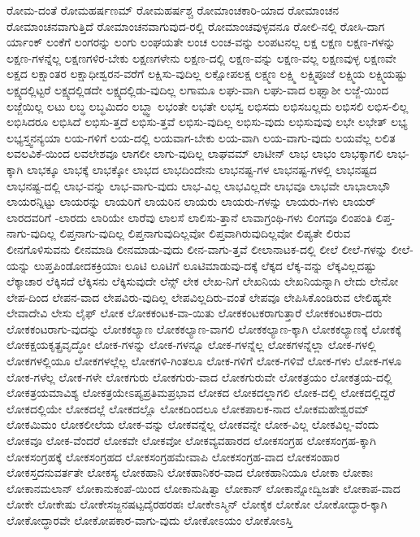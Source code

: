 {ರೋಮ-ದಂತೆ
ರೋಮಹರ್ಷಣಮ್
ರೋಮಹರ್ಷಶ್ಚ
ರೋಮಾಂಚಕಾರಿ-ಯಾದ
ರೋಮಾಂಚನ
ರೋಮಾಂಚನವಾಗುತ್ತಿದೆ
ರೋಮಾಂಚನವಾಗುವುದ-ರಲ್ಲಿ
ರೋಮಾಂಚವುಳ್ಳವನೂ
ರೋಲಿ-ನಲ್ಲಿ
ರೋಸಿ-ದಾಗ
ರ್ಯಾಂಕ್
ಲಂಕೆಗೆ
ಲಂಗರನ್ನು
ಲಂಗು
ಲಂಘಯತೇ
ಲಂಚ
ಲಂಚ-ವನ್ನು
ಲಂಪಟನಲ್ಲ
ಲಕ್ಷ
ಲಕ್ಷಣ
ಲಕ್ಷಣ-ಗಳನ್ನು
ಲಕ್ಷಣ-ಗಳನ್ನೆಲ್ಲ
ಲಕ್ಷಣಗಳಿರ-ಬೇಕು
ಲಕ್ಷಣಗಳೇನು
ಲಕ್ಷಣ-ದಲ್ಲಿ
ಲಕ್ಷಣ-ವನ್ನು
ಲಕ್ಷಣ-ವಲ್ಲ
ಲಕ್ಷಣವುಳ್ಳ
ಲಕ್ಷಣವೇ
ಲಕ್ಷದ
ಲಕ್ಷಾಂತರ
ಲಕ್ಷಾಧೀಶ್ವರನ-ವರೆಗೆ
ಲಕ್ಷಿಸು-ವುದಿಲ್ಲ
ಲಕ್ಷೋಪಲಕ್ಷ
ಲಕ್ಷ್ಮಣ
ಲಕ್ಷ್ಮಿ
ಲಕ್ಷ್ಮಿಪೂಜೆ
ಲಕ್ಷ್ಮಿಯ
ಲಕ್ಷ್ಮಿಯಷ್ಟು
ಲಕ್ಷ್ಯದಲ್ಲಿಟ್ಟರೆ
ಲಕ್ಷ್ಯದಲ್ಲಿಡದೇ
ಲಕ್ಷ್ಯದಲ್ಲಿಡು-ವುದಿಲ್ಲ
ಲಗಾಮೂ
ಲಘು-ವಾಗಿ
ಲಘು-ವಾದ
ಲಘ್ವಾಶೀ
ಲಜ್ಜೆ-ಯಿಂದ
ಲಜ್ಜೆಯಿಲ್ಲ
ಲಟು
ಲಬ್ಧ
ಲಬ್ಧಮಿದಂ
ಲಬ್ಧ್ವಾ
ಲಭಂತೇ
ಲಭತೇ
ಲಭಸ್ವ
ಲಭಿಸದು
ಲಭಿಸಬಲ್ಲದು
ಲಭಿಸಲಿ
ಲಭಿಸ-ಲಿಲ್ಲ
ಲಭಿಸಿದರೂ
ಲಭಿಸಿದೆ
ಲಭಿಸು-ತ್ತದೆ
ಲಭಿಸು-ತ್ತವೆ
ಲಭಿಸು-ವುದಿಲ್ಲ
ಲಭಿಸು-ವುದು
ಲಭಿಸುವುವು
ಲಭೇ
ಲಭೇತ್
ಲಭ್ಯ
ಲಭ್ಯಸ್ತ್ವನನ್ಯಯಾ
ಲಯ-ಗಳಿಗೆ
ಲಯ-ದಲ್ಲಿ
ಲಯವಾಗ-ಬೇಕು
ಲಯ-ವಾಗಿ
ಲಯ-ವಾಗು-ವುದು
ಲಯವೆಲ್ಲ
ಲಲಿತ
ಲವಲವಿಕೆ-ಯಿಂದ
ಲವಲೇಶವೂ
ಲಾಗಲೀ
ಲಾಗು-ವುದಿಲ್ಲ
ಲಾಘವಮ್
ಲಾಟೀನ್
ಲಾಭ
ಲಾಭಂ
ಲಾಭಕ್ಕಾಗಲಿ
ಲಾಭ-ಕ್ಕಾಗಿ
ಲಾಭಕ್ಕೂ
ಲಾಭಕ್ಕೆ
ಲಾಭಕ್ಕೋ
ಲಾಭದ
ಲಾಭದಿಂದೇನು
ಲಾಭನಷ್ಟ-ಗಳ
ಲಾಭನಷ್ಟ-ಗಳಲ್ಲಿ
ಲಾಭನಷ್ಟದ
ಲಾಭನಷ್ಟ-ದಲ್ಲಿ
ಲಾಭ-ವನ್ನು
ಲಾಭ-ವಾಗು-ವುದು
ಲಾಭ-ವಿಲ್ಲ
ಲಾಭವಿಲ್ಲದೇ
ಲಾಭವೂ
ಲಾಭವೇ
ಲಾಭಾಲಾಭೌ
ಲಾಯರನ್ನಿಟ್ಟು
ಲಾಯರನ್ನು
ಲಾಯರಿಗೆ
ಲಾಯರಿನ
ಲಾಯರು
ಲಾಯರು-ಗಳನ್ನು
ಲಾಯರು-ಗಳು
ಲಾಯರ್
ಲಾರದವರಿಗೆ
-ಲಾರದು
ಲಾರಿಯೇ
ಲಾರೆವು
ಲಾಲಸೆ
ಲಾಲಿಸು-ತ್ತಾನೆ
ಲಾವಾಗ್ರಂಥಿ-ಗಳು
ಲಿಂಗವೂ
ಲಿಂಪಂತಿ
ಲಿಪ್ತ-ನಾಗು-ವುದಿಲ್ಲ
ಲಿಪ್ತನಾಗು-ವುದಿಲ್ಲ
ಲಿಪ್ತನಾಗುವುದಿಲ್ಲವೋ
ಲಿಪ್ತವಾಗಿರುವುದಿಲ್ಲವೋ
ಲಿಪ್ಯತೇ
ಲಿರುವ
ಲೀನಗೊಳಿಸುವನು
ಲೀನಮಾಡಿ
ಲೀನಮಾಡು-ವುದು
ಲೀನ-ವಾಗು-ತ್ತವೆ
ಲೀಲಾನಾಟಕ-ದಲ್ಲಿ
ಲೀಲೆ
ಲೀಲೆ-ಗಳನ್ನು
ಲೀಲೆ-ಯನ್ನು
ಲುಪ್ತಪಿಂಡೋದಕಕ್ರಿಯಾಃ
ಲೂಟಿ
ಲೂಟಿಗೆ
ಲೂಟಿಮಾಡುವು-ದಕ್ಕೆ
ಲೆಕ್ಕದ
ಲೆಕ್ಕ-ವನ್ನು
ಲೆಕ್ಕವಿಲ್ಲದಷ್ಟು
ಲೆಕ್ಕಾಚಾರ
ಲೆಕ್ಕಿಸದೆ
ಲೆಕ್ಕಿಸನು
ಲೆಕ್ಕಿಸುವುದೇ
ಲೆನ್ಸ್
ಲೇಕ
ಲೇಖ-ನಿಗೆ
ಲೇಖನಿಯ
ಲೇಖನಿಯನ್ನಾಗಿ
ಲೇದು
ಲೇನೋ
ಲೇಪ-ದಿಂದ
ಲೇಪನ-ವಾದ
ಲೇಪವಿರು-ವುದಿಲ್ಲ
ಲೇಪವಿಲ್ಲದಿರು-ವಂತೆ
ಲೇಪವೂ
ಲೇಪಿಸಿಕೊಂಡಿರುವ
ಲೇಲಿಹ್ಯಸೇ
ಲೇವಾದೇವಿ
ಲೇಸು
ಲೈಫ್
ಲೋಕ
ಲೋಕಕಂಟಕ-ವಾ-ಯಿತು
ಲೋಕಕಂಟಕರಾಗುತ್ತಾರೆ
ಲೋಕಕಂಟಕರಾ-ದರು
ಲೋಕಕಂಟರಾಗು-ವುದನ್ನು
ಲೋಕಕಲ್ಯಾಣ
ಲೋಕಕಲ್ಯಾಣ-ವಾಗಲಿ
ಲೋಕಕಲ್ಯಾಣ-ಕ್ಕಾಗಿ
ಲೋಕಕಲ್ಯಾಣಕ್ಕೆ
ಲೋಕಕ್ಕೆ
ಲೋಕಕ್ಷಯಕೃತ್ಪ್ರವೃದ್ಧೋ
ಲೋಕ-ಗಳನ್ನು
ಲೋಕ-ಗಳನ್ನೂ
ಲೋಕ-ಗಳನ್ನೆಲ್ಲ
ಲೋಕಗಳನ್ನೆಲ್ಲಾ
ಲೋಕ-ಗಳಲ್ಲಿ
ಲೋಕಗಳಲ್ಲಿಯೂ
ಲೋಕಗಳಲ್ಲೆಲ್ಲ
ಲೋಕಗಳಿ-ಗಿಂತಲೂ
ಲೋಕ-ಗಳಿಗೆ
ಲೋಕ-ಗಳಿವೆ
ಲೋಕ-ಗಳು
ಲೋಕ-ಗಳೂ
ಲೋಕ-ಗಳೆಲ್ಲ
ಲೋಕ-ಗಳೇ
ಲೋಕಗುರು
ಲೋಕಗುರು-ವಾದ
ಲೋಕಗುರುವೇ
ಲೋಕತ್ರಯಂ
ಲೋಕತ್ರಯ-ದಲ್ಲಿ
ಲೋಕತ್ರಯಮಾವಿಶ್ಯ
ಲೋಕತ್ರಯೇಽಪ್ಯಪ್ರತಿಮಪ್ರಭಾವ
ಲೋಕದ
ಲೋಕದಲ್ಲಾಗಲಿ
ಲೋಕ-ದಲ್ಲಿ
ಲೋಕದಲ್ಲಿದ್ದರೆ
ಲೋಕದಲ್ಲಿಯೇ
ಲೋಕದಲ್ಲೆ
ಲೋಕದಲ್ಲೊ
ಲೋಕದಿಂದಲೂ
ಲೋಕಪಾಲಕ-ನಾದ
ಲೋಕಮಹೇಶ್ವರಮ್
ಲೋಕಮಿಮಂ
ಲೋಕಲೀಲೆಯ
ಲೋಕ-ವನ್ನು
ಲೋಕವನ್ನೆಲ್ಲ
ಲೋಕವನ್ನೇ
ಲೋಕ-ವಿಲ್ಲ
ಲೋಕವಿಲ್ಲ-ವೆಂದು
ಲೋಕವೂ
ಲೋಕ-ವೆಂದರೆ
ಲೋಕವೇ
ಲೋಕವೋ
ಲೋಕವ್ಯವಹಾರದ
ಲೋಕಸಂಗ್ರಹ
ಲೋಕಸಂಗ್ರಹ-ಕ್ಕಾಗಿ
ಲೋಕಸಂಗ್ರಹಕ್ಕೆ
ಲೋಕಸಂಗ್ರಹದ
ಲೋಕಸಂಗ್ರಹಮೇವಾಪಿ
ಲೋಕಸಂಗ್ರಹ-ವಾದ
ಲೋಕಸಂಹಾರ
ಲೋಕಸ್ತದನುವರ್ತತೇ
ಲೋಕಸ್ಯ
ಲೋಕಹಾನಿ
ಲೋಕಹಾನಿಕರ-ವಾದ
ಲೋಕಹಾನಿಯೂ
ಲೋಕಾ
ಲೋಕಾಃ
ಲೋಕಾನಮಲಾನ್
ಲೋಕಾನುಕಂಪೆ-ಯಿಂದ
ಲೋಕಾನುಷಿತ್ವಾ
ಲೋಕಾನ್
ಲೋಕಾನ್ನೋದ್ವಿಜತೇ
ಲೋಕಾಪ-ವಾದ
ಲೋಕೇ
ಲೋಕೇಷು
ಲೋಕೇಸಜ್ಜನಷಟ್ಪದೈರಹರಹಃ
ಲೋಕೇಽಸ್ಮಿನ್
ಲೋಕೈಕ
ಲೋಕೋ
ಲೋಕೋದ್ಧಾರ-ಕ್ಕಾಗಿ
ಲೋಕೋದ್ಧಾರವೇ
ಲೋಕೋಪಕಾರ-ವಾಗು-ವುದು
ಲೋಕೋಽಯಂ
ಲೋಕೋಽಸ್ತಿ
}
